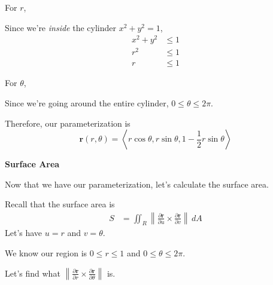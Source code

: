 \documentclass{article}
\newcommand{\lra}[1]{\left\langle #1 \right\rangle}
\newcommand{\norm}[1]{\left\lVert #1 \right\rVert}
\renewcommand{\r}[0]{\mathbf{r}}
\begin{document}
For $r$,

Since we're \textit{inside} the cylinder $x^2+y^2=1$,
\begin{align*}
    x^2+y^2&\leq 1\\
    r^2&\leq 1\tag{in polar, $x^2+y^2=r^2$}\\
    r&\leq 1\tag{$r\geq 0$ is always true}
\end{align*}

For $\theta$,

Since we're going around the entire cylinder, $0\leq \theta\leq 2\pi$.

Therefore, our parameterization is
\begin{equation*}
    \r(r,\theta)=\lra{r\cos\theta,r\sin\theta, 1-\frac{1}{2}r\sin\theta}\tag{$0\leq r\leq 1$, $0\leq \theta\leq 2\pi$}
\end{equation*}
{}\textbf{Surface Area}

Now that we have our parameterization, let's calculate the surface area.

Recall that the surface area is
\begin{align*}
    S&=\iint_R \norm{\frac{\partial \r}{\partial u}\times \frac{\partial \r}{\partial v}}\,dA
\end{align*}
Let's have $u=r$ and $v=\theta$.

We know our region is $0\leq r\leq 1$ and $0\leq \theta\leq 2\pi$.

Let's find what $\displaystyle\norm{\frac{\partial \r}{\partial r}\times \frac{\partial \r}{\partial \theta}} $ is.
\end{document}
